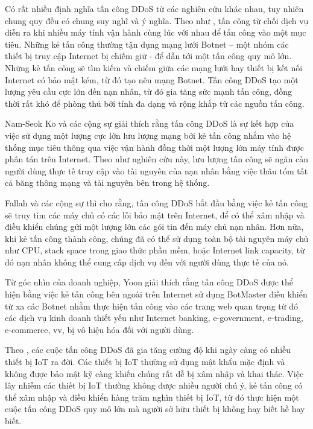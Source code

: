 Có rất nhiều định nghĩa tấn công DDoS từ các nghiên cứu khác nhau, tuy nhiên chung quy đều có chung suy nghĩ và ý nghĩa.
Theo như \cite{1-dos-concept}, tấn công từ chối dịch vụ diễn ra khi nhiều máy tính vận hành cùng lúc với nhau để tấn công vào một mục tiêu. Những kẻ tấn công thường tận dụng mạng lưới Botnet – một nhóm các thiết bị truy cập Internet bị chiếm giữ - để dẫn tới một tấn công quy mô lớn. Những kẻ tấn công sẽ tìm kiếm và chiếm giữa  các mạng lưới hay thiết bị kết nối Internet có bảo mật kém, từ đó tạo nên mạng Botnet. Tấn công DDoS tạo một lượng yêu cầu cực lớn đến nạn nhân, từ đó gia tăng sức mạnh tấn công, đồng thời rất khó để phòng thủ bởi tính đa dạng và rộng khắp từ các nguồn tấn công.

Nam-Seok Ko và các cộng sự \cite{3-Ko} giải thích rằng tấn công DDoS là sự kết hợp của việc sử dụng một lượng cực lớn lưu lượng mạng bởi kẻ tấn công nhắm vào hệ thống mục tiêu thông qua việc vận hành đồng thời một lượng lớn máy tính được phân tán trên Internet. Theo như nghiên cứu này, lưu lượng tấn công sẽ ngăn cản người dùng thực tế truy cập vào tài nguyên của nạn nhân bằng việc thâu tóm tất cả băng thông mạng và tài nguyên bên trong hệ thống.

Fallah và các cộng sự \cite{4-Fallah} thì cho rằng, tấn công DDoS bắt đầu bằng việc kẻ tấn công sẽ truy tìm các máy chủ có các lỗi bảo mật trên Internet, để có thể xâm nhập và điều khiển chúng gửi một lượng lớn các gói tin đến máy chủ nạn nhân. Hơn nữa, khi kẻ tấn công thành công, chúng đã có thể sử dụng toàn bộ tài nguyên máy chủ như CPU, stack space trong giao thức phần mềm, hoặc Internet link capacity, từ đó nạn nhân không thể cung cấp dịch vụ đến với người dùng thực tế của nó.

Từ góc nhìn của doanh nghiệp, Yoon \cite{5-Yoon} giải thích rằng tấn công DDoS được thể hiện bằng việc kẻ tấn công bên ngoài trên Internet sử dụng BotMaster điều khiển từ xa các Botnet nhằm thực hiện tấn công vào các trang web quan trọng từ đó các dịch vụ kinh doanh thiết yếu như Internet banking, e-government, e-trading, e-commerce, vv, bị vô hiệu hóa đối với người dùng.

Theo \cite{1-dos-concept}, các cuộc tấn công DDoS đã gia tăng cường độ khi ngày càng có nhiều thiết bị IoT ra đời. Các thiết bị IoT thường sử dụng mật khẩu mặc định và không được bảo mật kỹ càng khiến chúng rất dễ bị xâm nhập và khai thác. Việc lây nhiễm các thiết bị IoT thường không được nhiều người chú ý, kẻ tấn công có thể xâm nhập và điều khiển hàng trăm nghìn thiết bị IoT, từ đó thực hiện một cuộc tấn công DDoS quy mô lớn mà người sở hữu thiết bị không hay biết hề hay biết.

